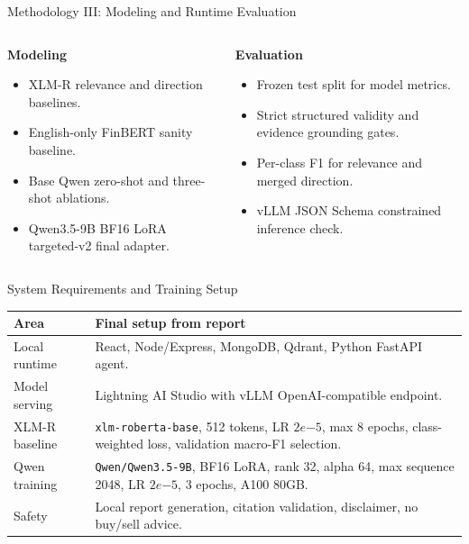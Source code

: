 \documentclass[aspectratio=169,11pt]{beamer}
\begin{document}
\begin{frame}{Methodology III: Modeling and Runtime Evaluation}
  \begin{columns}[T,onlytextwidth]
    \begin{column}{0.49\textwidth}
      \textbf{Modeling}
      \begin{itemize}
        \item XLM-R relevance and direction baselines.
        \item English-only FinBERT sanity baseline.
        \item Base Qwen zero-shot and three-shot ablations.
        \item Qwen3.5-9B BF16 LoRA targeted-v2 final adapter.
      \end{itemize}
    \end{column}
    \begin{column}{0.49\textwidth}
      \textbf{Evaluation}
      \begin{itemize}
        \item Frozen test split for model metrics.
        \item Strict structured validity and evidence grounding gates.
        \item Per-class F1 for relevance and merged direction.
        \item vLLM JSON Schema constrained inference check.
      \end{itemize}
    \end{column}
  \end{columns}
\end{frame}

\begin{frame}{System Requirements and Training Setup}
  \small
  \begin{tabularx}{\textwidth}{@{}lY@{}}
    \toprule
    Area & Final setup from report \\
    \midrule
    Local runtime & React, Node/Express, MongoDB, Qdrant, Python FastAPI agent. \\
    Model serving & Lightning AI Studio with vLLM OpenAI-compatible endpoint. \\
    XLM-R baseline & \texttt{xlm-roberta-base}, 512 tokens, LR \(2e{-5}\), max 8 epochs, class-weighted loss, validation macro-F1 selection. \\
    Qwen training & \texttt{Qwen/Qwen3.5-9B}, BF16 LoRA, rank 32, alpha 64, max sequence 2048, LR \(2e{-5}\), 3 epochs, A100 80GB. \\
    Safety & Local report generation, citation validation, disclaimer, no buy/sell advice. \\
    \bottomrule
  \end{tabularx}
\end{frame}
\end{document}
